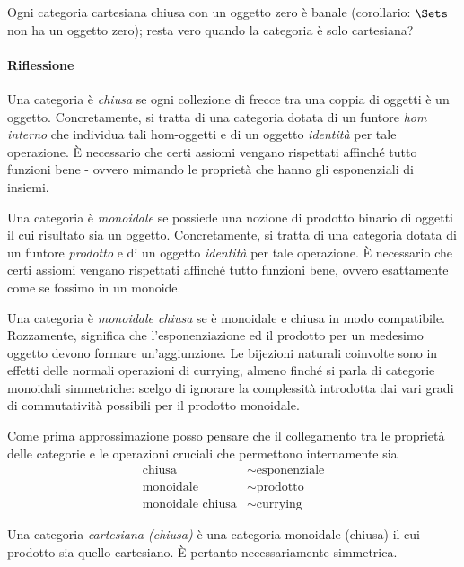 \begin{MyExercise}
Ogni categoria cartesiana chiusa con un oggetto zero è banale (corollario: $\Sets$ non ha un oggetto zero); resta vero quando la categoria è solo cartesiana?
\end{MyExercise}

\paragraph*{Riflessione}

Una categoria è {\em chiusa} se ogni collezione di frecce tra una coppia di oggetti è un oggetto.
Concretamente, si tratta di una categoria dotata di un funtore {\em hom interno} che individua tali hom-oggetti e di un oggetto {\em identità} per tale operazione. È necessario che certi assiomi vengano rispettati affinché tutto funzioni bene - ovvero mimando le proprietà che hanno gli esponenziali di insiemi.

Una categoria è {\em monoidale} se possiede una nozione di prodotto binario di oggetti il cui risultato sia un oggetto.
Concretamente, si tratta di una categoria dotata di un funtore {\em prodotto} e di un oggetto {\em identità} per tale operazione. È necessario che certi assiomi vengano rispettati affinché tutto funzioni bene, ovvero esattamente come se fossimo in un monoide.

Una categoria è {\em monoidale chiusa} se è monoidale e chiusa in modo compatibile.
Rozzamente, significa che l'esponenziazione ed il prodotto per un medesimo oggetto devono formare un'aggiunzione. Le bijezioni naturali coinvolte sono in effetti delle normali operazioni di currying, almeno finché si parla di categorie monoidali simmetriche: scelgo di ignorare la complessità introdotta dai vari gradi di commutatività possibili per il prodotto monoidale.

Come prima approssimazione posso pensare che il collegamento tra le proprietà delle categorie e le operazioni cruciali che permettono internamente sia
\begin{align*}
\text{chiusa}          & \sim \text{esponenziale}\\
\text{monoidale}       & \sim \text{prodotto}\\
\text{monoidale chiusa}& \sim \text{currying}
\end{align*}

{\df Una categoria {\em cartesiana (chiusa)} è una categoria monoidale (chiusa) il cui prodotto sia quello cartesiano. È pertanto necessariamente simmetrica.}




